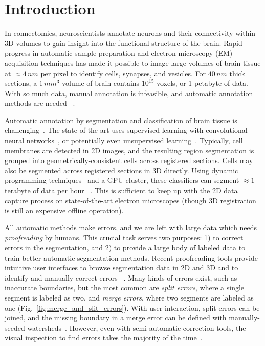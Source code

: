 \section{Introduction}

In connectomics, neuroscientists annotate neurons and their connectivity within 3D volumes to gain insight into the functional structure of the brain. Rapid progress in automatic sample preparation and electron microscopy (EM) acquisition techniques has made it possible to image large volumes of brain tissue at $\approx4\, nm$ per pixel to identify cells, synapses, and vesicles. For $40\, nm$ thick sections, a $1\, mm^3$ volume of brain contains $10^{15}$ voxels, or 1 petabyte of data. With so much data, manual annotation is infeasible, and automatic annotation methods are needed ~\cite{jain2010,Liu2014,GALA2014,kaynig2015large}.

Automatic annotation by segmentation and classification of brain tissue is challenging~\cite{isbi_challenge}. The state of the art uses supervised learning with convolutional neural networks~\cite{Ciresan:2012f}, or potentially even unsupervised learning~\cite{BogovicHJ13}. Typically, cell membranes are detected in 2D images, and the resulting region segmentation is grouped into geometrically-consistent cells across registered sections. Cells may also be segmented across registered sections in 3D directly. Using dynamic programming techniques~\cite{Masci:2013a} and a GPU cluster, these classifiers can segment $\approx1$ terabyte of data per hour ~\cite{kasthuri2015saturated}. This is sufficient to keep up with the 2D data capture process on state-of-the-art electron microscopes (though 3D registration is still an expensive offline operation).

All automatic methods make errors, and we are left with large data which needs \emph{proofreading} by humans. This crucial task serves two purposes: 1) to correct errors in the segmentation, and 2) to provide a large body of labeled data to train better automatic segmentation methods. Recent proofreading tools provide intuitive user interfaces to browse segmentation data in 2D and 3D and to identify and manually correct errors ~\cite{markus_proofreading,raveler,mojo2,haehn_dojo_2014}. Many kinds of errors exist, such as inaccurate boundaries, but the most common are \emph{split errors}, where a single segment is labeled as two, and \emph{merge errors}, where two segments are labeled as one (Fig.~\ref{fig:merge_and_slit_errors}). With user interaction, split errors can be joined, and the missing boundary in a merge error can be defined with manually-seeded watersheds~\cite{haehn_dojo_2014}. However, even with semi-automatic correction tools, the visual inspection to find errors takes the majority of the time~\cite{proofreading_bottleneck}.

